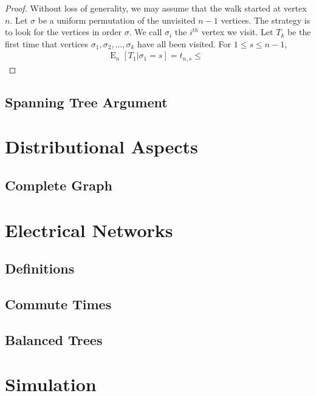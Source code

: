\documentclass[12pt]{article}
\theoremstyle{definition}
\DeclareMathOperator{\E}{\mathrm{E}}		%
\DeclareMathOperator{\hit}{t_{\textrm{hit}}}%
\begin{document}
\begin{proof}
Without loss of generality, we may assume that the walk started at vertex $n$.
Let $\sigma$ be a uniform permutation of the unvisited $n-1$ vertices.
The strategy is to look for the vertices in order $\sigma$.
We call $\sigma_i$ the $i^{th}$ vertex we visit.
Let $T_k$ be the first time that vertices $\sigma_1, \sigma_2, ..., \sigma_k$
have all been visited.
For $1 \leq s \leq n-1$,
\begin{align}
\E_n[T_1 | \sigma_1 = s] = t_{n,s} \leq \hit \nonumber
\end{align}
\end{proof}

\subsection{Spanning Tree Argument}

\section{Distributional Aspects}
\subsection{Complete Graph}

\section{Electrical Networks}
\subsection{Definitions}
\subsection{Commute Times}
\subsection{Balanced Trees}

\section{Simulation}

\cite{AF14}
\cite{BH94}
\cite{Bo98}
\cite{DS84}
\cite{Du11}
\cite{Gr10}
\cite{LP17}
\end{document}
